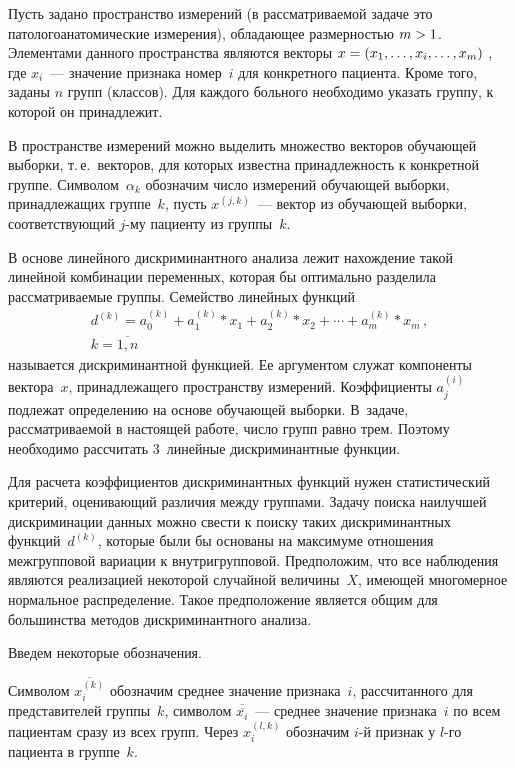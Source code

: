 \begin{multicols}{2}
Пусть задано пространство измерений (в рассматриваемой задаче это
патологоанатомические измерения), обладающее  размерностью $m \hm>
1$. Элементами данного пространства являются векторы  $x\hm = (x_1,
\ldots ,x_i, \ldots , x_m)$ , где $x_i$~--- значение признака номер~$i$ 
для конкретного пациента. Кроме того, заданы $n$ групп
(классов). Для каждого больного необходимо указать группу, к
которой он принадлежит.

В пространстве измерений можно выделить множество векторов обучающей
выборки, т.\,е.\ векторов, для которых известна принадлежность к
конкретной группе. Символом~$\alpha_k$  обозначим число измерений
обучающей выборки, принадлежащих группе~$k$, пусть $x^{(j,k)}$~---
вектор из обучающей выборки, соответствующий $j$-му пациенту из
группы~$k$.

В основе линейного дискриминантного анализа лежит нахождение такой
линейной комбинации переменных, которая бы оптимально разделила
рассматриваемые группы. Семейство линейных функций
\begin{multline*}
 d^{(k)} = a_0^{(k)} +  a_1^{(k)}*x_1 + a_2^{(k)}*x_2 + 
 \cdots + a_m^{(k)}*x_m\,,\\
  k = \overline{1,n}
 \end{multline*}
называется дискриминантной функцией. Ее аргументом служат
компоненты вектора~$x$, принадлежащего пространству измерений.
Коэффициенты $a_j^{(i)}$ подлежат определению на основе обучающей
выборки. В~задаче, рассматриваемой в настоящей работе, число
групп равно трем. Поэтому необходимо рассчитать 3~линейные дискриминантные функции.

Для расчета коэффициентов дискриминантных функций нужен
статистический критерий, оценивающий различия между группами.
Задачу поиска наилучшей дискриминации данных можно свести к поиску
таких дискриминантных функций~$d^{(k)}$, которые были бы основаны
на максимуме отношения межгрупповой вариации к внутригрупповой.
Предположим, что все наблюдения являются реализацией некоторой
случайной величины~$X$, имеющей многомерное нормальное
распределение. Такое предположение является общим для большинства
методов дискриминантного анализа.

Введем некоторые обозначения.

Символом $\overline{x_i^{(k)}} $ обозначим среднее значение признака~$i$, 
рас\-счи\-тан\-но\-го для представителей группы~$k$, символом
$\overline{\overline{x_i}}$~--- среднее значение признака~$i$ по всем
пациентам сразу из всех групп. Через $x_i^{(l,k)}$ обозначим $i$-й
признак у $l$-го пациента в группе~$k$.


\end{multicols}
